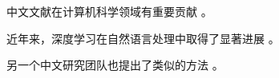 \documentclass{article}
\begin{document}
中文文献在计算机科学领域有重要贡献 \cite{li2024cjk}。

近年来，深度学习在自然语言处理中取得了显著进展 \cite{wang2023zh}。

另一个中文研究团队也提出了类似的方法 \cite{chen2024cn}。
\end{document}
